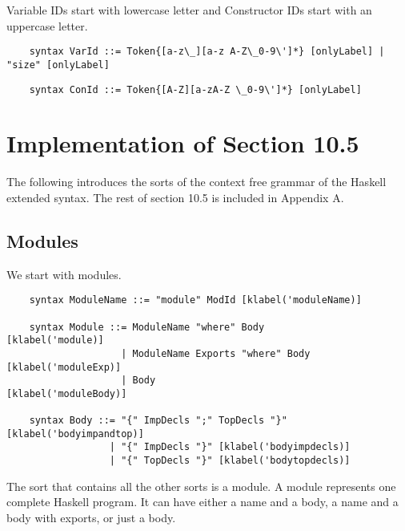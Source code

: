 Variable IDs start with lowercase letter and Constructor IDs start with an uppercase letter.

\begin{lstlisting}
    syntax VarId ::= Token{[a-z\_][a-z A-Z\_0-9\']*} [onlyLabel] | "size" [onlyLabel]
\end{lstlisting}
\begin{lstlisting}
    syntax ConId ::= Token{[A-Z][a-zA-Z \_0-9\']*} [onlyLabel]
\end{lstlisting}

\section{Implementation of Section 10.5}
The following introduces the sorts of the context free grammar of the Haskell extended syntax. The rest of section 10.5 is included in Appendix A.

\subsection{Modules}
We start with modules.
\begin{lstlisting}
    syntax ModuleName ::= "module" ModId [klabel('moduleName)]

    syntax Module ::= ModuleName "where" Body          [klabel('module)]
                    | ModuleName Exports "where" Body  [klabel('moduleExp)]
                    | Body                             [klabel('moduleBody)]

    syntax Body ::= "{" ImpDecls ";" TopDecls "}" [klabel('bodyimpandtop)]
                  | "{" ImpDecls "}" [klabel('bodyimpdecls)]
                  | "{" TopDecls "}" [klabel('bodytopdecls)]
\end{lstlisting}

The sort that contains all the other sorts is a module. A module represents one complete Haskell program. It can have either a name and a body, a name and a body with exports, or just a body.

